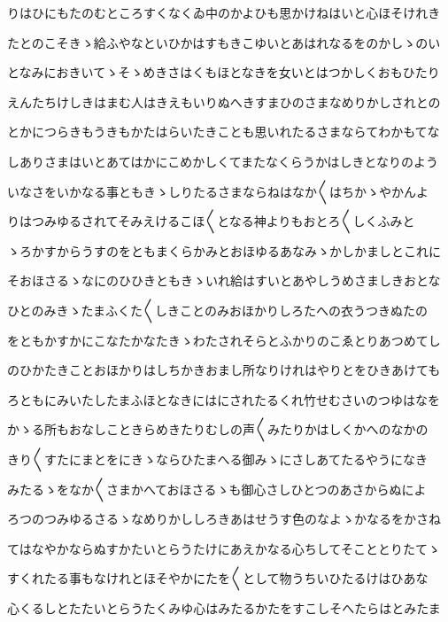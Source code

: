 \documentclass[a4paper,11pt,landscape]{ltjtarticle}
\begin{document}
\par\medskip
りはひにもたのむところすくなくゐ中のかよひも思かけねはいと心ほそけれき
\par\medskip
たとのこそきゝ給ふやなといひかはすもきこゆいとあはれなるをのかしゝのい
\par\medskip
となみにおきいてゝそゝめきさはくもほとなきを女いとはつかしくおもひたり
\par\medskip
えんたちけしきはまむ人はきえもいりぬへきすまひのさまなめりかしされとの
\par\medskip
とかにつらきもうきもかたはらいたきことも思いれたるさまならてわかもてな
\par\medskip
しありさまはいとあてはかにこめかしくてまたなくらうかはしきとなりのよう
\par\medskip
いなさをいかなる事ともきゝしりたるさまならねはなか〱はちかゝやかんよ
\par\medskip
りはつみゆるされてそみえけるこほ〱となる神よりもおとろ〱しくふみと
\par\medskip
ゝろかすからうすのをともまくらかみとおほゆるあなみゝかしかましとこれに
\par\medskip
そおほさるゝなにのひひきともきゝいれ給はすいとあやしうめさましきおとな
\par\medskip
ひとのみきゝたまふくた〱しきことのみおほかりしろたへの衣うつきぬたの
\par\medskip
をともかすかにこなたかなたきゝわたされそらとふかりのこゑとりあつめてし
\par\medskip
のひかたきことおほかりはしちかきおまし所なりけれはやりとをひきあけても
\par\medskip
ろともにみいたしたまふほとなきにはにされたるくれ竹せむさいのつゆはなを
\par\medskip
かゝる所もおなしこときらめきたりむしの声〱みたりかはしくかへのなかの
\par\medskip
きり〱すたにまとをにきゝならひたまへる御みゝにさしあてたるやうになき
\par\medskip
みたるゝをなか〱さまかへておほさるゝも御心さしひとつのあさからぬによ
\par\medskip
ろつのつみゆるさるゝなめりかししろきあはせうす色のなよゝかなるをかさね
\par\medskip
てはなやかならぬすかたいとらうたけにあえかなる心ちしてそこととりたてゝ
\par\medskip
すくれたる事もなけれとほそやかにたを〱として物うちいひたるけはひあな
\par\medskip
心くるしとたたいとらうたくみゆ心はみたるかたをすこしそへたらはとみたま
\par\medskip
\end{document}
